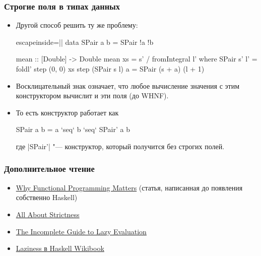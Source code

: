 \documentclass[11pt]{beamer}
\begin{document}
\begin{frame}[fragile]
  \frametitle{Строгие поля в типах данных}
  \begin{itemize}
    \item Другой способ решить ту же проблему:
          \begin{haskellsmall*}{escapeinside=||}
            data SPair a b = SPair !a !b

            mean :: [Double] -> Double
            mean xs = s' / fromIntegral l'
            where SPair s' l' = foldl' step (0, 0) xs
                  step (SPair s l) a = SPair (s + a) (l + 1)
          \end{haskellsmall*}
          \pause
    \item Восклицательный знак означает, что любое вычисление значения с этим конструктором вычислит и эти поля (до WHNF).
    \item То есть конструктор работает как
          \begin{haskell}
            SPair a b = a `seq` b `seq` SPair' a b
          \end{haskell}
          где \haskinline|SPair'| "--- конструктор, который получится без строгих полей.
  \end{itemize}
\end{frame}

\begin{frame}[fragile]
  \frametitle{Дополнительное чтение}
  \begin{itemize}
    \item \href{https://blog.acolyer.org/2016/09/14/why-functional-programming-matters/}{Why Functional Programming Matters} (статья, написанная до появления собственно Haskell)
    \item \href{https://www.fpcomplete.com/blog/2017/09/all-about-strictness}{All About Strictness}
    \item \href{https://apfelmus.nfshost.com/articles/lazy-eval.html}{The Incomplete Guide to Lazy Evaluation}
    \item \href{https://en.wikibooks.org/wiki/Haskell/Laziness}{Laziness в Haskell Wikibook}
  \end{itemize}
\end{frame}
\end{document}
